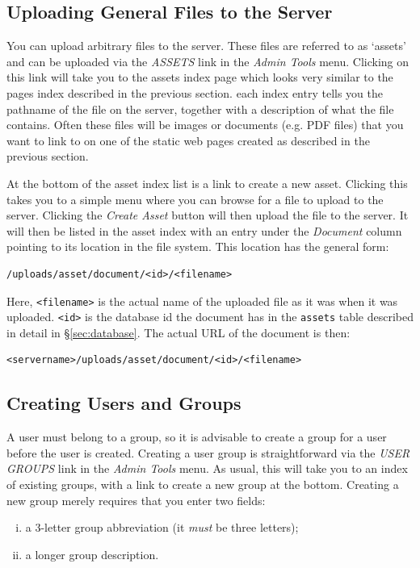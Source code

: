\documentclass[12pt,twoside]{article}
\begin{document}
\subsection{Uploading General Files to the Server}
You can upload arbitrary files to the server. These files are referred
to as `assets' and can be uploaded via the \emph{ASSETS} link in the
\emph{Admin Tools} menu. Clicking on this link will take you to the
assets index page which looks very similar to the pages index described
in the previous section.
each index entry tells you the pathname of the file on the server,
together with a description of what the file contains. Often these files
will be images or documents (e.g. PDF files) that you want to link to
on one of the static web pages created as described in the previous
section.

At the bottom of the asset index list is a link to create a new asset.
Clicking this takes you to a simple menu where you can browse for a file
to upload to the server. Clicking the \emph{Create Asset} button will
then upload the file to the server. It will then be listed in the
asset index with an entry under the \emph{Document} column pointing
to its location in the file system. This location has the general form:
\begin{verbatim}
/uploads/asset/document/<id>/<filename>
\end{verbatim}
Here, \verb=<filename>= is the actual name of the uploaded file as it was
when it was uploaded. \verb=<id>= is the database id the document has
in the \verb=assets= table described in detail in \S\ref{sec:database}.
The actual URL of the document is then:
\begin{verbatim}
<servername>/uploads/asset/document/<id>/<filename>
\end{verbatim}

\subsection{Creating Users and Groups}
A user must belong to a group, so it is advisable to create a group for a
user before the user is created. Creating a user group is straightforward
via the \emph{USER GROUPS} link in the \emph{Admin Tools} menu.
As usual, this will take you to an index of existing groups, with a link
to create a new group at the bottom. Creating a new group merely requires
that you enter two fields:
\begin{enumerate}[(i)]
\item
a 3-letter group abbreviation (it \emph{must} be three letters);
\item
a longer group description.
\end{enumerate}
\end{document}
